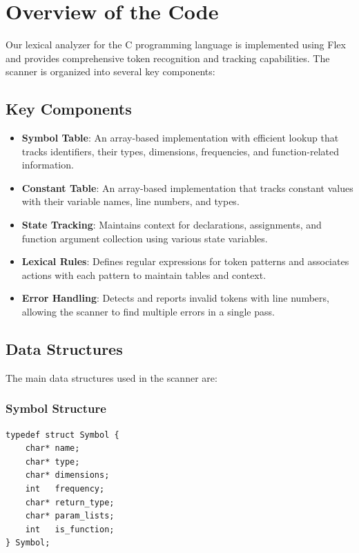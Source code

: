 \documentclass[12pt]{article}
\begin{document}
\section{Overview of the Code}

Our lexical analyzer for the C programming language is implemented using Flex and provides comprehensive token recognition and tracking capabilities. The scanner is organized into several key components:

\subsection{Key Components}
\begin{itemize}
    \item \textbf{Symbol Table}: An array-based implementation with efficient lookup that tracks identifiers, their types, dimensions, frequencies, and function-related information.
    
    \item \textbf{Constant Table}: An array-based implementation that tracks constant values with their variable names, line numbers, and types.
    
    \item \textbf{State Tracking}: Maintains context for declarations, assignments, and function argument collection using various state variables.
    
    \item \textbf{Lexical Rules}: Defines regular expressions for token patterns and associates actions with each pattern to maintain tables and context.
    
    \item \textbf{Error Handling}: Detects and reports invalid tokens with line numbers, allowing the scanner to find multiple errors in a single pass.
\end{itemize}

\subsection{Data Structures}
The main data structures used in the scanner are:

\subsubsection{Symbol Structure}
\begin{verbatim}
typedef struct Symbol {
    char* name;
    char* type;         
    char* dimensions;   
    int   frequency;    
    char* return_type;  
    char* param_lists;  
    int   is_function;  
} Symbol;
\end{verbatim}
\end{document}
